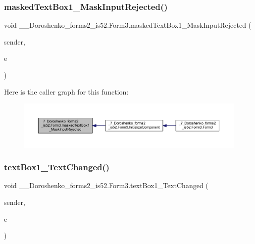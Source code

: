 \subsubsection{\texorpdfstring{masked\+Text\+Box1\+\_\+\+Mask\+Input\+Rejected()}{maskedTextBox1\_MaskInputRejected()}}
{\footnotesize\ttfamily void \+\_\+\_\+\+Doroshenko\+\_\+forms2\+\_\+is52.\+Form3.\+masked\+Text\+Box1\+\_\+\+Mask\+Input\+Rejected (\begin{DoxyParamCaption}\item[{object}]{sender,  }\item[{Mask\+Input\+Rejected\+Event\+Args}]{e }\end{DoxyParamCaption})\hspace{0.3cm}{\ttfamily [private]}}

Here is the caller graph for this function\+:
\nopagebreak
\begin{figure}[H]
\begin{center}
\leavevmode
\includegraphics[width=350pt]{class__7___doroshenko__forms2__is52_1_1_form3_ac3f56359793ceb0d1149f7264dd29004_icgraph}
\end{center}
\end{figure}
\hypertarget{class__7___doroshenko__forms2__is52_1_1_form3_ae0b02381848f523a55ededfae3026c11}{}\label{class__7___doroshenko__forms2__is52_1_1_form3_ae0b02381848f523a55ededfae3026c11} 
\subsubsection{\texorpdfstring{text\+Box1\+\_\+\+Text\+Changed()}{textBox1\_TextChanged()}}
{\footnotesize\ttfamily void \+\_\+\_\+\+Doroshenko\+\_\+forms2\+\_\+is52.\+Form3.\+text\+Box1\+\_\+\+Text\+Changed (\begin{DoxyParamCaption}\item[{object}]{sender,  }\item[{Event\+Args}]{e }\end{DoxyParamCaption})\hspace{0.3cm}{\ttfamily [private]}}

